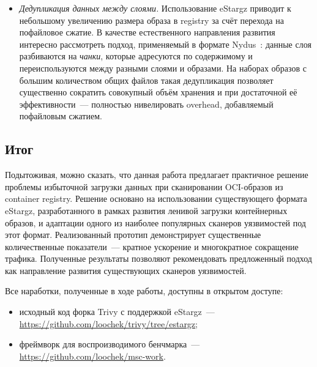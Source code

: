 \begin{itemize}
\item \textit{Дедупликация данных между слоями.} Использование eStargz приводит к небольшому увеличению размера образа в registry за счёт перехода на пофайловое сжатие. В качестве естественного направления развития интересно рассмотреть подход, применяемый в формате Nydus~\cite{nydus}: данные слоя разбиваются на \textit{чанки}, которые адресуются по содержимому и переиспользуются между разными слоями и образами. На наборах образов с большим количеством общих файлов такая дедупликация позволяет существенно сократить совокупный объём хранения и при достаточной её эффективности~--- полностью нивелировать overhead, добавляемый пофайловым сжатием.

\end{itemize}

\subsection{Итог}

Подытоживая, можно сказать, что данная работа предлагает практичное решение проблемы избыточной загрузки данных при сканировании OCI-образов из container registry. Решение основано на использовании существующего формата eStargz, разработанного в рамках развития ленивой загрузки контейнерных образов, и адаптации одного из наиболее популярных сканеров уязвимостей под этот формат. Реализованный прототип демонстрирует существенные количественные показатели~--- кратное ускорение и многократное сокращение трафика. Полученные результаты позволяют рекомендовать предложенный подход как направление развития существующих сканеров уязвимостей.

Все наработки, полученные в ходе работы, доступны в открытом доступе:
\begin{itemize}
\item исходный код форка Trivy с поддержкой eStargz~--- \url{https://github.com/loochek/trivy/tree/estargz};
\item фреймворк для воспроизводимого бенчмарка~--- \url{https://github.com/loochek/msc-work}.
\end{itemize}

\newpage
